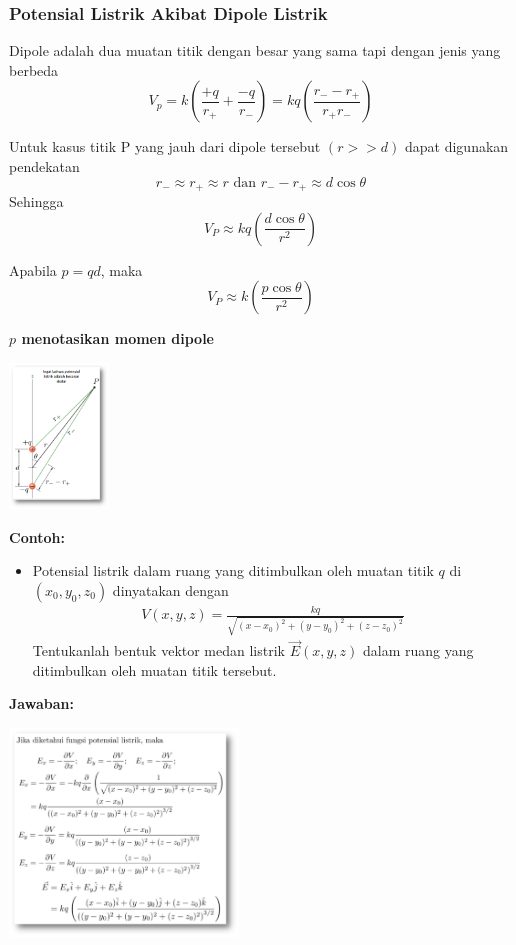 \documentclass[twocolumn, 11pt]{article}%
\begin{document}
     \subsubsection{Potensial Listrik Akibat Dipole Listrik}%
     Dipole adalah dua muatan titik dengan besar yang sama tapi dengan jenis yang berbeda
     \[V_p=k\left(\frac{+q}{r_+} + \frac{-q}{r_-}\right) = kq\left(\frac{r_- - r_+}{r_+ r_-}\right) \]
    
     Untuk kasus titik P yang jauh dari dipole tersebut $(r >> d)$ dapat digunakan pendekatan
     \[ r_- \approx r_+ \approx r\text{ dan } r_--r_+ \approx d\cos\theta\]
     Sehingga
     \[ V_P\approx kq\left(\frac{d\cos\theta}{r^2}\right) \]
    
     Apabila $p=qd$, maka
     \[ V_P \approx k\left(\frac{p\cos\theta}{r^2}\right) \]

     \textbf{$p$ menotasikan momen dipole} 

     \begin{center}
         \includegraphics[width=100px]{10.png}
     \end{center}

     \textbf{Contoh:} 
     \begin{itemize}
         \item Potensial listrik dalam ruang yang ditimbulkan oleh muatan titik $q$ di $(x_0,y_0,z_0)$ dinyatakan dengan
             \begin{align*}
             V(x,y,z)=\frac{kq}{\sqrt{(x-x_0)^2+(y-y_0)^2+(z-z_0)^2}}
             \end{align*}
             Tentukanlah bentuk vektor medan listrik $\vec E(x,y,z)$ dalam ruang yang ditimbulkan oleh muatan titik tersebut.
     \end{itemize}

     \textbf{Jawaban:} 
     \begin{center}
         \includegraphics[width=230px]{11.png}
     \end{center}
\end{document}
